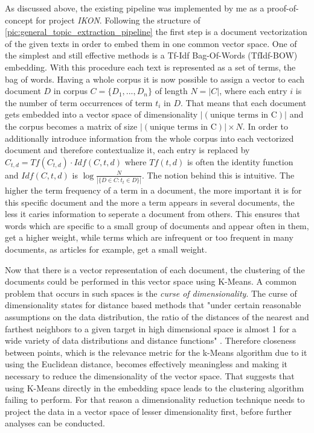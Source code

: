 As discussed above, the existing pipeline was implemented by me as a proof-of-concept for project \textit{IKON}. Following the structure of \autoref{pic:general_topic_extraction_pipeline} the first step is a document vectorization of the given texts in order to embed them in one common vector space. One of the simplest and still effective methods is a Tf-Idf Bag-Of-Words (TfIdf-BOW) embedding. With this procedure each text is represented as a set of terms, the bag of words. Having a whole corpus it is now possible to assign a vector to each document $D$ in corpus $C=\{D_1, ..., D_n\}$ of length $N = |C|$, where each entry $i$ is the number of term occurrences of term $t_i$ in $D$. That means that each document gets embedded into a vector space of dimensionality $|(\text{unique terms in C})|$ and the corpus becomes a matrix of size $|(\text{unique terms in C})| \times N$. In order to additionally introduce information from the whole corpus into each vectorized document and therefore contextualize it, each entry is replaced by $C_{t,d}=Tf(C_{t,d}) \cdot Idf(C,t,d)$ where $Tf(t,d)$ is often the identity function and $Idf(C,t,d)$ is $\log\frac{N}{|\{ D \in C : t_t \in D \}|}$. \cite{PivotedDocumentLength} The notion behind this is intuitive. The higher the term frequency of a term in a document, the more important it is for this specific document and the more a term appears in several documents, the less it caries information to seperate a document from others. This ensures that words which are specific to a small group of documents and appear often in them, get a higher weight, while terms which are infrequent or too frequent in many documents, as articles for example, get a small weight.

Now that there is a vector representation of each document, the clustering of the documents could be performed in this vector space using K-Means. A common problem that occurs in such spaces is the \textit{curse of dimensionality}. The curse of dimensionality states for distance based methods that "under certain reasonable assumptions on the data distribution, the ratio of the distances of the nearest and farthest neighbors to a given target in high dimensional space is almost 1 for a wide variety of data distributions and distance functions" \cite{aggarwalSurprisingBehaviorDistance2001}. Therefore closeness between points, which is the relevance metric for the k-Means algorithm due to it using the Euclidean distance, becomes effectively meaningless and making it necessary to reduce the dimensionality of the vector space. That suggests that using K-Means directly in the embedding space leads to the clustering algorithm failing to perform. For that reason a dimensionality reduction technique needs to project the data in a vector space of lesser dimensionality first, before further analyses can be conducted.

